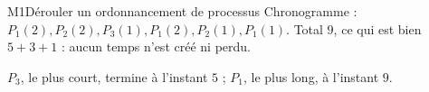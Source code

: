 \begin{fichemethode}{M1}{Dérouler un ordonnancement de processus}
Chronogramme : $P_1(2), P_2(2), P_3(1), P_1(2), P_2(1), P_1(1)$. Total $9$, ce qui est bien
$5+3+1$ : aucun temps n'est créé ni perdu.

$P_3$, le plus court, termine à l'instant $5$ ; $P_1$, le plus long, à l'instant $9$.

%
%
%
%
%
%
%


\end{fichemethode}
